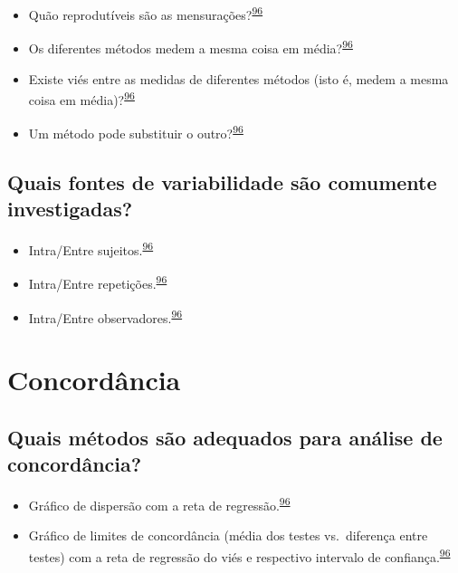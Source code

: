\documentclass[
]{book}
\begin{document}
\begin{itemize}
\item
  Quão reprodutíveis são as mensurações?\textsuperscript{\protect\hyperlink{ref-altman1983}{96}}
\item
  Os diferentes métodos medem a mesma coisa em média?\textsuperscript{\protect\hyperlink{ref-altman1983}{96}}
\item
  Existe viés entre as medidas de diferentes métodos (isto é, medem a mesma coisa em média)?\textsuperscript{\protect\hyperlink{ref-altman1983}{96}}
\item
  Um método pode substituir o outro?\textsuperscript{\protect\hyperlink{ref-altman1983}{96}}
\end{itemize}

\hypertarget{quais-fontes-de-variabilidade-suxe3o-comumente-investigadas}{%
\subsection{Quais fontes de variabilidade são comumente investigadas?}\label{quais-fontes-de-variabilidade-suxe3o-comumente-investigadas}}

\begin{itemize}
\item
  Intra/Entre sujeitos.\textsuperscript{\protect\hyperlink{ref-altman1983}{96}}
\item
  Intra/Entre repetições.\textsuperscript{\protect\hyperlink{ref-altman1983}{96}}
\item
  Intra/Entre observadores.\textsuperscript{\protect\hyperlink{ref-altman1983}{96}}
\end{itemize}

\hypertarget{concordancia}{%
\section{Concordância}\label{concordancia}}

\hypertarget{quais-muxe9todos-suxe3o-adequados-para-anuxe1lise-de-concorduxe2ncia}{%
\subsection{Quais métodos são adequados para análise de concordância?}\label{quais-muxe9todos-suxe3o-adequados-para-anuxe1lise-de-concorduxe2ncia}}

\begin{itemize}
\item
  Gráfico de dispersão com a reta de regressão.\textsuperscript{\protect\hyperlink{ref-altman1983}{96}}
\item
  Gráfico de limites de concordância (média dos testes vs.~diferença entre testes) com a reta de regressão do viés e respectivo intervalo de confiança.\textsuperscript{\protect\hyperlink{ref-altman1983}{96}}
\end{itemize}
\end{document}
